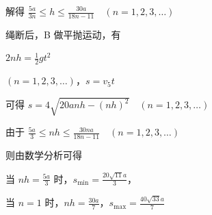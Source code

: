 \documentclass[\gkver]{gaokaozhenti}
\begin{document}
\begin{enumerate}
{解得 $\frac{5a}{3n} \leq h \leq \frac{30a}{18n - 11} \quad (n = 1, 2, 3, \ldots)$

绳断后，B 做平抛运动，有

$2nh = \frac{1}{2}gt^{2}$

$(n = 1, 2, 3, \ldots)$，$s = v_{5}t$

可得 $s = 4\sqrt{20anh - (nh)^{2}} \quad (n = 1, 2, 3, \ldots)$

由于 $\frac{5a}{3} \leq nh \leq \frac{30na}{18n - 11} \quad (n = 1, 2, 3, \ldots)$

则由数学分析可得

当 $nh = \frac{5a}{3}$ 时，$s_{\min} = \frac{20\sqrt{11}a}{3}$，

当 $n = 1$ 时，$nh = \frac{30a}{7}$，$s_{\max} = \frac{40\sqrt{33}a}{7}$
}

\end{enumerate}
\end{document}
